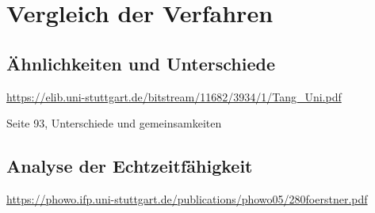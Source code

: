 \chapter{Vergleich der Verfahren}

\section{Ähnlichkeiten und Unterschiede}

\url{https://elib.uni-stuttgart.de/bitstream/11682/3934/1/Tang_Uni.pdf} 

Seite 93, Unterschiede und gemeinsamkeiten 

\section{Analyse der Echtzeitfähigkeit}


\url{https://phowo.ifp.uni-stuttgart.de/publications/phowo05/280foerstner.pdf}


